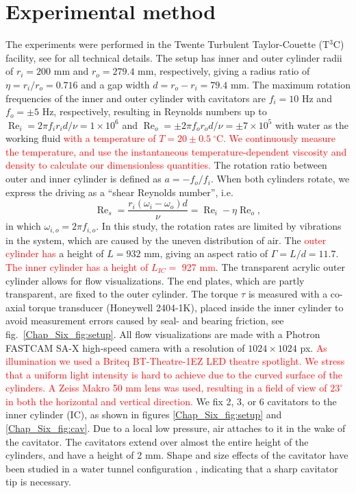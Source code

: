 \documentclass[aps,onecolumn,10pt, floatfix, superscriptaddress,longbibliography, pra]{revtex4-1}
\newcommand{\red}[1]{\textcolor{red}{#1}}
\renewcommand{\Re}{\operatorname{Re}}
\begin{document}
\section{Experimental method}
\label{sec:exp}

The experiments were performed in the Twente Turbulent Taylor-Couette (T$^3$C) facility, see \citet{gil11} for all technical details. The setup has inner and outer cylinder radii of $r_i = 200$ mm and $r_o = 279.4$ mm, respectively, giving a radius ratio of $\eta = r_i/r_o = 0.716$ and a gap width $d=r_o-r_i=79.4$ mm. The maximum rotation frequencies of the inner and outer cylinder with cavitators are $f_i=10$ Hz and $f_o= \pm5$ Hz, respectively, resulting in Reynolds numbers up to $\Re_i = 2\pi f_i r_i d/\nu = 1 \times 10^6$ and $\Re_o = \pm 2 \pi f_o r_o d / \nu = \pm 7 \times 10^5$ with water as the working fluid \red{with a temperature of $T = 20\pm0.5~^{\circ}$C. We continuously measure the temperature, and use the instantaneous temperature-dependent viscosity and density to calculate our dimensionless quantities.} The rotation ratio between outer and inner cylinder is defined as $a=-f_o / f_i$.
When both cylinders rotate, we express the driving as a ``shear Reynolds number'', i.e.\ 
\begin{equation}
\Re_s = \frac{r_i(\omega_i  -  \omega_o) d }{\nu} = \Re_i - \eta \Re_o, 
\end{equation}
in which $\omega_{i,o} = 2 \pi f_{i,o}$. In this study, the rotation rates are limited by vibrations in the system, which are caused by the uneven distribution of air. The \red{outer cylinder has} a height of $L = 932$ mm, giving an aspect ratio of $\Gamma = L/d = 11.7$. \red{The inner cylinder has a height of $L_{IC} = $ 927 mm}. The transparent acrylic outer cylinder allows for flow visualizations. The end plates, which are partly transparent, are fixed to the outer cylinder. The torque $\tau$ is measured with a co-axial torque transducer (Honeywell 2404-1K), placed inside the inner cylinder to avoid measurement errors caused by seal- and bearing friction, see fig.\ \ref{Chap_Six_fig:setup}. All flow visualizations are made with a Photron FASTCAM SA-X high-speed camera with a resolution of $1024 \times 1024$ px. \red{As illumination we used a Briteq BT-Theatre-1EZ LED theatre spotlight. We stress that a uniform light intensity is hard to achieve due to the curved surface of the cylinders. A Zeiss Makro 50 mm lens was used, resulting in a field of view of $23^{\circ}$ in both the horizontal and vertical direction.}
We fix 2, 3, or 6 cavitators to the inner cylinder (IC), as shown in figures \ref{Chap_Six_fig:setup} and \ref{Chap_Six_fig:cav}. Due to a local low pressure, air attaches to it in the wake of the cavitator. The cavitators extend over almost the entire height of the cylinders, and have a height of 2 mm. Shape and size effects of the cavitator have been studied in a water tunnel configuration \citep{Zverkhovskyi2014}, indicating that a sharp cavitator tip is necessary.
\end{document}
